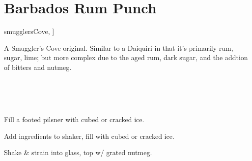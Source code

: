 \section[Barbados Rum Punch]{
    Barbados Rum Punch~
}

\begin{recipestats}[
        servings=1,
        preptime=5~\minute,
        original=\citeauthor{smugglersCove}~\cite[p.~179]{smugglersCove},
    ]
\end{recipestats}

\begin{recipeabstract}
    A Smuggler's Cove original.
    Similar to a Daiquiri in that it's primarily rum, sugar, lime; but more
    complex due to the aged rum, dark sugar, and the addtion of bitters and nutmeg.
\end{recipeabstract}

\begin{ingredientcolumns}[1]
    \begin{ingredientblock}
        \\
        \\
        \\
    \end{ingredientblock}
\end{ingredientcolumns}

\begin{preparation}
\item Fill a footed pilsner with cubed or cracked ice.
\item Add ingredients to shaker, fill with cubed or cracked ice.
\item Shake \& strain into glass, top w/ grated nutmeg.
\end{preparation}

\recipeend%
